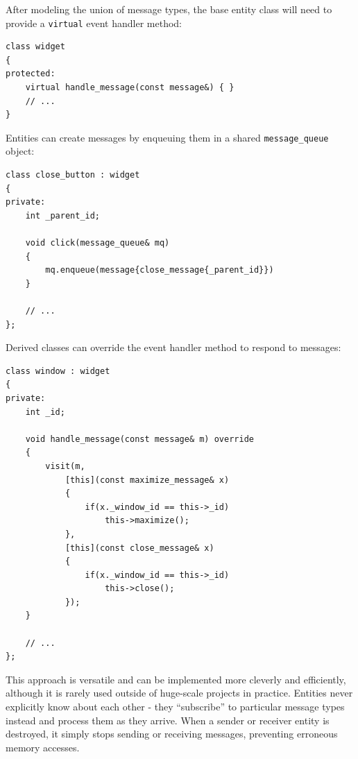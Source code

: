 \documentclass[oneside, 12pt, a4paper, openany]{book}
\begin{document}
After modeling the union of message types, the base entity class will
need to provide a
\texttt{virtual}
event handler method:

\begin{verbatim}
class widget
{
protected:
    virtual handle_message(const message&) { }
    // ...
}
\end{verbatim}

Entities can create messages by enqueuing them in a shared
\texttt{message_queue}
object:

\begin{verbatim}
class close_button : widget
{
private:
    int _parent_id;

    void click(message_queue& mq)
    {
        mq.enqueue(message{close_message{_parent_id}})
    }

    // ...
};
\end{verbatim}

Derived classes can override the event handler method to respond to
messages:

\begin{verbatim}
class window : widget
{
private:
    int _id;

    void handle_message(const message& m) override
    {
        visit(m,
            [this](const maximize_message& x)
            {
                if(x._window_id == this->_id)
                    this->maximize();
            },
            [this](const close_message& x)
            {
                if(x._window_id == this->_id)
                    this->close();
            });
    }

    // ...
};
\end{verbatim}

This approach is versatile and can be implemented more cleverly and
efficiently, although it is rarely used outside of huge-scale projects
in practice. Entities never explicitly know about each other - they
``subscribe'' to particular message types instead and process them as
they arrive. When a sender or receiver entity is destroyed, it simply
stops sending or receiving messages, preventing erroneous memory
accesses.
\end{document}
